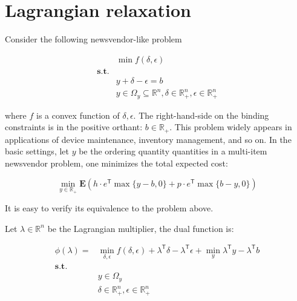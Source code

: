 \documentclass[
  a4paper,
,tablecaptionabove
]{scrartcl}
\author{Chuwen}
\date{\today}
\title{}
\author{Chuwen}
\numberwithin{equation}{section}
\begin{document}




{
\setcounter{tocdepth}{3}
\tableofcontents
}
\hypertarget{sec:lagrangian-relaxation}{%
  \section{Lagrangian relaxation}\label{lagrangian-relaxation}}

Consider the following newsvendor-like problem

\[\begin{aligned}
                  & \min f(\delta, \epsilon)                                                                       \\
    \mathbf{s.t.} &                                                                                                \\
                  & y + \delta - \epsilon = b                                                                      \\
                  & y \in \Omega_y \subseteq \mathbb{R}^n, \delta \in \mathbb{R}^n_+ , \epsilon \in \mathbb{R}^n_+
  \end{aligned}\]

where \(f\) is a convex function of \(\delta, \epsilon\). The
right-hand-side on the binding constraints is in the positive orthant:
\(b \in \mathbb R_+.\) This problem widely appears in applications of
device maintenance, inventory management, and so on. In the basic
settings, let \(y\) be the ordering quantity quantities in a multi-item
newsvendor problem, one minimizes the total expected cost:

\[\min_{y \in \mathbb R_+} \mathbf E\left(h\cdot e^\mathsf{T} \max\{y - b,  0\} + p \cdot e^\mathsf{T} \max\{b - y,  0\}\right)\]

It is easy to verify its equivalence to the problem above.

Let \(\lambda\in\mathbb{R}^n\) be the Lagrangian multiplier, the dual
function is:

\[\begin{aligned}
    \phi(\lambda) = & \min_{\delta, \epsilon} f(\delta, \epsilon) + \lambda^\mathsf{T}\delta - \lambda^\mathsf{T} \epsilon+ \min_y \lambda^\mathsf{T} y - \lambda^\mathsf{T} b \\
    \mathbf{s.t.}   &                                                                                                                                                          \\
                    & y \in \Omega_y                                                                                                                                           \\
                    & \delta \in \mathbb{R}^n_+ , \epsilon \in \mathbb{R}^n_+
  \end{aligned}\]
\end{document}

